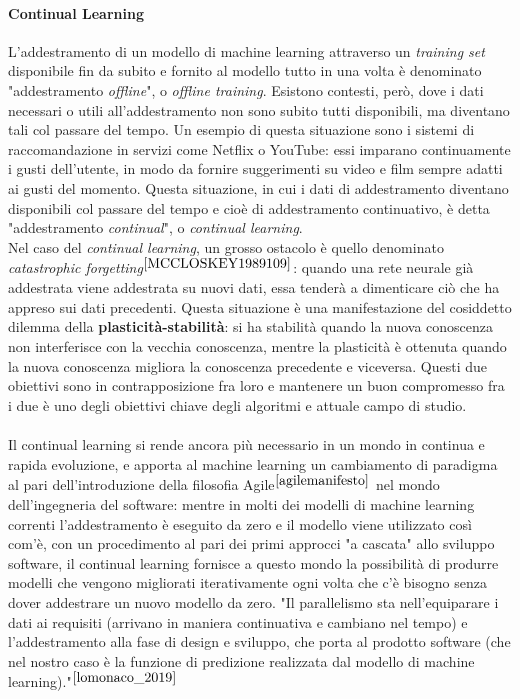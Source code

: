 \paragraph{Continual Learning} L'addestramento di un modello di machine learning attraverso un \textit{training set} disponibile fin da subito e fornito al modello tutto in una volta è denominato "addestramento \textit{offline}", o \textit{offline training}. Esistono contesti, però, dove i dati necessari o utili all'addestramento non sono subito tutti disponibili, ma diventano tali col passare del tempo. Un esempio di questa situazione sono i sistemi di raccomandazione in servizi come Netflix o YouTube: essi imparano continuamente i gusti dell'utente, in modo da fornire suggerimenti su video e film sempre adatti ai gusti del momento. Questa situazione, in cui i dati di addestramento diventano disponibili col passare del tempo e cioè di addestramento continuativo, è detta "addestramento \textit{continual}", o \textit{continual learning}.\\
Nel caso del \textit{continual learning}, un grosso ostacolo è quello denominato \textit{catastrophic forgetting}$^{\cite{MCCLOSKEY1989109}}$: quando una rete neurale già addestrata viene addestrata su nuovi dati, essa tenderà a dimenticare ciò che ha appreso sui dati precedenti. Questa situazione è una manifestazione del cosiddetto dilemma della \textbf{plasticità-stabilità}: si ha stabilità quando la nuova conoscenza non interferisce con la vecchia conoscenza, mentre la plasticità è ottenuta quando la nuova conoscenza migliora la conoscenza precedente e viceversa. Questi due obiettivi sono in contrapposizione fra loro e mantenere un buon compromesso fra i due è uno degli obiettivi chiave degli algoritmi e attuale campo di studio.\\\\
Il continual learning si rende ancora più necessario in un mondo in continua e rapida evoluzione, e apporta al machine learning un cambiamento di paradigma al pari dell'introduzione della filosofia Agile$^{\cite{agilemanifesto}}$ nel mondo dell'ingegneria del software: mentre in molti dei modelli di machine learning correnti l'addestramento è eseguito da zero e il modello viene utilizzato così com'è, con un procedimento al pari dei primi approcci "a cascata" allo sviluppo software, il continual learning fornisce a questo mondo la possibilità di produrre modelli che vengono migliorati iterativamente ogni volta che c'è bisogno senza dover addestrare un nuovo modello da zero. "Il parallelismo sta nell'equiparare i dati ai requisiti (arrivano in maniera continuativa e cambiano nel tempo) e l'addestramento alla fase di design e sviluppo, che porta al prodotto software (che nel nostro caso è la funzione di predizione realizzata dal modello di machine learning)."$^{\cite{lomonaco_2019}}$

